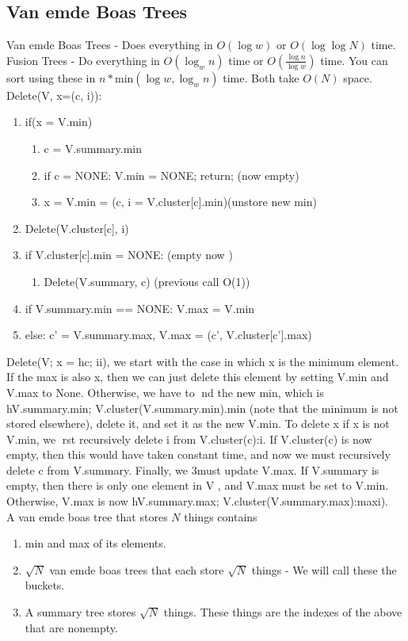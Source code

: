 \documentclass[10pt,twocolumn]{article}
\begin{document}
\subsection{Van emde Boas Trees}

Van emde Boas Trees - Does everything in $O(\log w)$ or $O(\log \log N)$ time.
Fusion Trees - Do everything in $O(\log_{w}{n})$ time or $O(\frac{\log{n}}{\log{w}})$ time.
You can sort using these in $n * $min$(\log w, \log_{w}{n})$ time.
Both take $O(N)$ space.\\
Delete(V, x=(c, i)):\\
\begin{enumerate}
    \item if(x = V.min)
        \begin{enumerate}
            \item c = V.summary.min
            \item if c = NONE: V.min = NONE; return; (now empty)
            \item x = V.min = (c, i = V.cluster[c].min)(unstore new min)
        \end{enumerate}
    \item Delete(V.cluster[c], i)
    \item if V.cluster[c].min = NONE: (empty now )
        \begin{enumerate}
            \item Delete(V.summary, c) (previous call O(1))
        \end{enumerate}
    \item if V.summary.min == NONE: V.max = V.min
    \item else: c' = V.summary.max, V.max = (c', V.cluster[c'].max)
\end{enumerate}
Delete(V; x = hc; ii), we start with the case in which x is the minimum
element. If the max is also x, then we can just delete this element by setting V.min and V.max to
None. Otherwise, we have to nd the new min, which is hV.summary.min; V.cluster(V.summary.min).min
(note that the minimum is not stored elsewhere), delete it, and set it as the new V.min. To delete x if
x is not V.min, we rst recursively delete i from V.cluster(c):i. If V.cluster(c) is now empty, then this
would have taken constant time, and now we must recursively delete c from V.summary. Finally, we
3must update V.max. If V.summary is empty, then there is only one element in V , and V.max must
be set to V.min. Otherwise, V.max is now hV.summary.max; V.cluster(V.summary.max):maxi).\\
A van emde boas tree that stores $N$ things contains
\begin{enumerate}
    \item min and max of its elements.
    \item $\sqrt{N}$ van emde boas trees that each store $\sqrt{N}$ things - We will call these the buckets.
    \item A summary tree stores $\sqrt{N}$ things. These things are the indexes of the above that are nonempty.
\end{enumerate}
\end{document}
